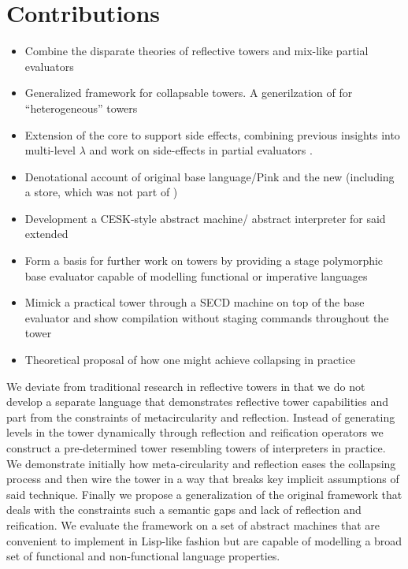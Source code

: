 \documentclass[fleqn]{article}
\theoremstyle{definition}
\begin{document}
\section{Contributions}
\begin{itemize}
	\item Combine the disparate theories of reflective towers and mix-like partial evaluators
	\item Generalized framework for collapsable towers. A generilzation of \cite{amin2017collapsing} for ``heterogeneous'' towers
	\item Extension of the core \mslang to support side effects, combining previous insights into multi-level $\lambda$ \cite{nielson1996multi} and work on side-effects in partial evaluators \cite{asai1997partial}.
	\item Denotational account of original base language/Pink and the new \mslang (including a store, which was not part of \cite{danvy1988intensions})
	\item Development a CESK-style abstract machine/ abstract interpreter for said extended \mslang
	\item Form a basis for further work on towers by providing a stage polymorphic base evaluator capable of modelling functional or imperative languages
	\item Mimick a practical tower through a SECD machine on top of the base evaluator and show compilation without staging commands throughout the tower
	\item Theoretical proposal of how one might achieve collapsing in practice
\end{itemize}

We deviate from traditional research in reflective towers in that we do not develop a separate language that demonstrates reflective tower capabilities and part from the constraints of metacircularity and reflection.
Instead of generating levels in the tower dynamically through reflection and reification operators we construct a pre-determined tower resembling towers of interpreters in practice. We demonstrate initially how meta-circularity and reflection
eases the collapsing process and then wire the tower in a way that breaks key implicit assumptions of said technique. Finally we propose a generalization of the original framework that deals with the constraints such a semantic gaps and lack of
reflection and reification. We evaluate the framework on a set of abstract machines that are convenient to implement in Lisp-like fashion but are capable of modelling a broad set of functional and non-functional language properties.
\end{document}

